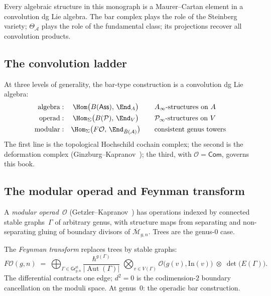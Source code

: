 \documentclass[11pt]{report}
\theoremstyle{definition}
\theoremstyle{remark}
\providecommand{\cA}{\mathcal{A}}
\providecommand{\cM}{\mathcal{M}}
\providecommand{\cO}{\mathcal{O}}
\providecommand{\cP}{\mathcal{P}}
\providecommand{\barB}{\bar{B}}
\numberwithin{equation}{section}
\begin{document}
Every algebraic structure in this monograph is a Maurer--Cartan element in a convolution dg Lie algebra. The bar complex plays the role of the Steinberg variety; $\Theta_\cA$ plays the role of the fundamental class; its projections recover all convolution products.

\subsection{The convolution ladder}

At three levels of generality, the bar-type construction is a convolution dg Lie algebra:
\begin{equation}\label{eq:intro-convolution-ladder}
\begin{array}{r@{\;:\quad}c@{\qquad}l}
\text{algebra} &
 \Hom\bigl(B(\mathsf{Ass}),\,\End_A\bigr)
 & A_\infty\text{-structures on }A \\[4pt]
\text{operad} &
 \Hom_\Sigma\bigl(B(\cP),\,\End_V\bigr)
 & \cP_\infty\text{-structures on }V \\[4pt]
\text{modular} &
 \Hom_\Sigma\bigl(F\cO,\,\End_{\barB(\cA)}\bigr)
 & \text{consistent genus towers}
\end{array}
\end{equation}
The first line is the topological Hochschild cochain complex; the second is the deformation complex (Ginzburg--Kapranov~\cite{GK94}); the third, with $\cO = \mathsf{Com}$, governs this book.

\subsection{The modular operad and Feynman transform}

A \emph{modular operad}~$\cO$ (Getzler--Kapranov~\cite{GeK98}) has operations indexed by connected stable graphs~$\Gamma$ of arbitrary genus, with structure maps from separating and non-separating gluing of boundary divisors of $\overline{\cM}_{g,n}$. Trees are the genus-$0$ case.

The \emph{Feynman transform} replaces trees by stable graphs:
\begin{equation}\label{eq:intro-feynman-sum}
F\cO(g,n)
\;=\;
\bigoplus_{\Gamma\in\mathsf{Gr}^{\mathrm{st}}_{g,n}}
\frac{\hbar^{g(\Gamma)}}{|\operatorname{Aut}(\Gamma)|}
\;\bigotimes_{v\in V(\Gamma)}\cO\bigl(g(v),\mathrm{In}(v)\bigr)
\;\otimes\;\det\bigl(E(\Gamma)\bigr).
\end{equation}
The differential contracts one edge; $d^2 = 0$ is the codimension-$2$ boundary cancellation on the moduli space. At genus~$0$: the operadic bar construction.
\end{document}
